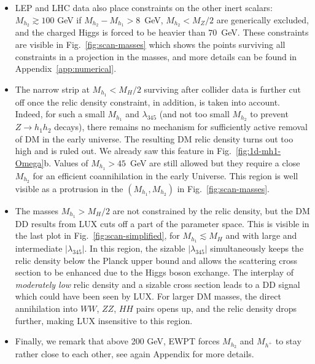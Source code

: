 \documentclass[12pt,a4paper]{article}
\begin{document}
\begin{itemize}
\item LEP and LHC data also place constraints on the other inert scalars: $M_{h_2}\gtrsim 100$ GeV if 
$M_{h_2}-M_{h_1}>8$~GeV, $M_{h_2} < M_Z/2$ are generically excluded, and 
the charged Higgs is forced to be heavier than $70$~GeV.
These constraints are visible in Fig.~\ref{fig:scan-masses} which shows the points surviving all constraints in a projection in the masses, and more details can be found in Appendix~\ref{app:numerical}.

\item The narrow strip at $M_{h_1}<M_H/2$ surviving after collider data is further cut off once the relic density constraint, in addition,
is taken into account. Indeed, for such a small $M_{h_1}$ and $\lambda_{345}$
(and not too small $M_{h_2}$ to prevent $Z \to h_1 h_2$ decays), 
there remains no mechanism for sufficiently active removal of DM 
in the early universe. The resulting DM relic density turns out too high and is ruled out. We already saw this feature 
in Fig.~\ref{fig:1d-mh1-Omega}b. Values of $M_{h_1} > 45$~GeV are still allowed but they require
a close $M_{h_2}$ for an efficient coannihilation in the early Universe.
This region is well visible as a protrusion in the $(M_{h_1},M_{h_2})$ in Fig.~\ref{fig:scan-masses}.

\item The masses $M_{h_1} > M_H/2$ are not constrained by the relic density,
but the DM DD results from LUX cuts off a part of the parameter space.
This is visible in the last plot in Fig.~\ref{fig:scan-simplified},
for $M_{h_1}\lesssim M_H$ and with large and intermediate $|\lambda_{345}|$.
In this region, the sizable $|\lambda_{345}|$ simultaneously keeps the relic density below the Planck upper bound
and allows the scattering cross section to be enhanced due to the Higgs boson exchange.
The interplay of {\em moderately low} relic density and a sizable cross section leads to a DD signal
which could have been seen by LUX.
For larger DM masses, the direct annihilation into $WW$, $ZZ$, $HH$ pairs opens up,
and the relic density drops further, making LUX insensitive to this region.

\item Finally, we remark that above 200 GeV, EWPT forces $M_{h_2}$ and $M_{h^{+}}$ to stay rather close
to each other, see again Appendix for more details.

\end{itemize}
\end{document}
